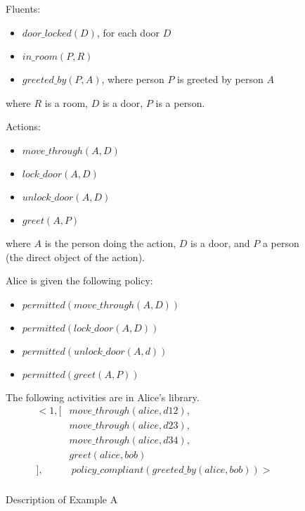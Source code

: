\begin{figure}[h]
    \begin{framed}
        Fluents:
        \begin{itemize}
            \item $door\_locked(D)$, for each door $D$
            \item $in\_room(P, R)$
            \item $greeted\_by(P, A)$, where person $P$ is greeted by person $A$
        \end{itemize}
        where $R$ is a room, $D$ is a door, $P$ is a person.

        Actions:
        \begin{itemize}
            \item $move\_through(A, D)$
            \item $lock\_door(A, D)$
            \item $unlock\_door(A, D)$
            \item $greet(A, P)$
        \end{itemize}
        where $A$ is the person doing the action, $D$ is a door, and $P$ a person (the direct object of the action).

        Alice is given the following policy:
        \begin{itemize}
            \item $permitted(move\_through(A, D))$
            \item $permitted(lock\_door(A, D))$
            \item $permitted(unlock\_door(A, d))$
            \item $permitted(greet(A, P))$
        \end{itemize}

        The following activities are in Alice's library.
        \begin{equation}
        \begin{split}
            <1, [
                & move\_through(alice, d12), \\
                & move\_through(alice, d23), \\
                & move\_through(alice, d34), \\
                & greet(alice, bob) \\
            ], & \ policy\_compliant(greeted\_by(alice, bob))> \\
        \end{split}
        \end{equation}
    \end{framed}
    \caption{Description of Example A}
    \label{fig:apia_example_a_description}
\end{figure}

